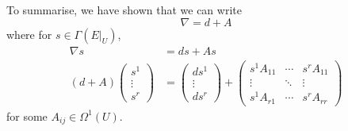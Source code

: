 \documentclass[a4paper]{article}
\theoremstyle{definition} \newtheorem*{definition}{Definition}
\theoremstyle{definition} \newtheorem*{definitions}{Definitions}
\theoremstyle{plain} \newtheorem{theorem}{Theorem}[section]
\theoremstyle{plain} \newtheorem{proposition}[theorem]{Proposition}
\theoremstyle{plain} \newtheorem{corollary}[theorem]{Corollary}
\theoremstyle{plain} \newtheorem{lemma}[theorem]{Lemma}
\theoremstyle{plain} \newtheorem{example}[theorem]{Example}
\begin{document}
To summarise, we have shown that we can write 
$$\nabla = d + A$$ 
where for $s\in \Gamma(E|_U)$,
\begin{align*}
\nabla s & = ds + As \\ 
(d+A)\begin{pmatrix}
    s^1 \\
    \vdots \\
    s^r
\end{pmatrix}
& = \begin{pmatrix}ds^1 \\ \vdots \\ ds^r\end{pmatrix} + \begin{pmatrix}
s^1A_{11} & \cdots & s^rA_{11}\\
\vdots & \ddots & \vdots \\
s^1A_{r1} & \cdots & s^rA_{rr}
\end{pmatrix} 
\end{align*}
for some $A_{ij}\in \Omega^1(U)$. 
\end{document}
